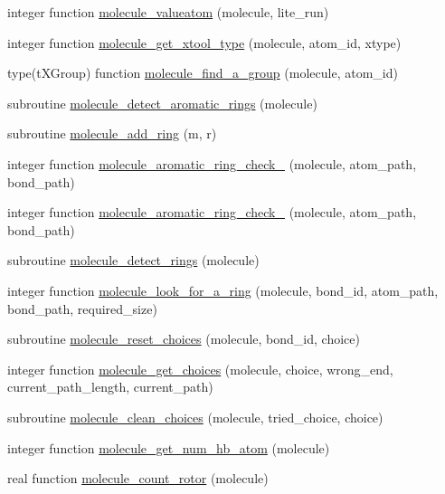 \begin{DoxyCompactItemize}
integer function \hyperlink{classcalc__xscore_a44cb565f51d7dd1b7e23c8d0b5f0948f}{molecule\-\_\-valueatom} (molecule, lite\-\_\-run)
\item 
integer function \hyperlink{classcalc__xscore_a7b8993bb07639d4696253ee328d039c9}{molecule\-\_\-get\-\_\-xtool\-\_\-type} (molecule, atom\-\_\-id, xtype)
\item 
type(t\-X\-Group) function \hyperlink{classcalc__xscore_a0e8b595cde8ab84134ff6d5bf40ca6d6}{molecule\-\_\-find\-\_\-a\-\_\-group} (molecule, atom\-\_\-id)
\item 
subroutine \hyperlink{classcalc__xscore_acbc037cbe77c71df72b9bdddd5aafc4b}{molecule\-\_\-detect\-\_\-aromatic\-\_\-rings} (molecule)
\item 
subroutine \hyperlink{classcalc__xscore_a11e5eae822e6fb6585759ee36a3afbec}{molecule\-\_\-add\-\_\-ring} (m, r)
\item 
integer function \hyperlink{classcalc__xscore_a38c66c1b4324d313e5b1c0c5bea86781}{molecule\-\_\-aromatic\-\_\-ring\-\_\-check\-\_} (molecule, atom\-\_\-path, bond\-\_\-path)
\item 
integer function \hyperlink{classcalc__xscore_aea77c3fd49d25e8437f6002d662239af}{molecule\-\_\-aromatic\-\_\-ring\-\_\-check\-\_} (molecule, atom\-\_\-path, bond\-\_\-path)
\item 
subroutine \hyperlink{classcalc__xscore_a65e27a3bda6359e0477b665f5f4f2822}{molecule\-\_\-detect\-\_\-rings} (molecule)
\item 
integer function \hyperlink{classcalc__xscore_a3fa40f44b00df2a04db56f4be7a39824}{molecule\-\_\-look\-\_\-for\-\_\-a\-\_\-ring} (molecule, bond\-\_\-id, atom\-\_\-path, bond\-\_\-path, required\-\_\-size)
\item 
subroutine \hyperlink{classcalc__xscore_a7b3d7dc22dbf0fcbf737f0e145c250db}{molecule\-\_\-reset\-\_\-choices} (molecule, bond\-\_\-id, choice)
\item 
integer function \hyperlink{classcalc__xscore_afadd2d70a94b99a5425e95d68277955a}{molecule\-\_\-get\-\_\-choices} (molecule, choice, wrong\-\_\-end, current\-\_\-path\-\_\-length, current\-\_\-path)
\item 
subroutine \hyperlink{classcalc__xscore_afe09b13e46b154cabd9436e46b49af46}{molecule\-\_\-clean\-\_\-choices} (molecule, tried\-\_\-choice, choice)
\item 
integer function \hyperlink{classcalc__xscore_ae6515e329019d64e695ab369150bc8ee}{molecule\-\_\-get\-\_\-num\-\_\-hb\-\_\-atom} (molecule)
\item 
real function \hyperlink{classcalc__xscore_addc9f221740037ba5655fb64e2fa59d1}{molecule\-\_\-count\-\_\-rotor} (molecule)

\end{DoxyCompactItemize}
